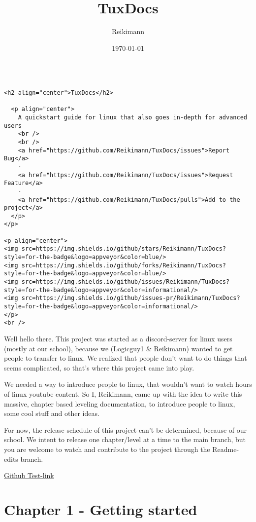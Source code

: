 \documentclass[a4]{article}
\author{Reikimann}
\date{\today}
\title{TuxDocs}
\begin{document}
\maketitle
\tableofcontents

\begin{verbatim}

<h2 align="center">TuxDocs</h2>

  <p align="center">
    A quickstart guide for linux that also goes in-depth for advanced users  
    <br />
    <br />
    <a href="https://github.com/Reikimann/TuxDocs/issues">Report Bug</a>
    ·
    <a href="https://github.com/Reikimann/TuxDocs/issues">Request Feature</a>
    ·
    <a href="https://github.com/Reikimann/TuxDocs/pulls">Add to the project</a>
  </p>
</p>

<p align="center">
<img src=https://img.shields.io/github/stars/Reikimann/TuxDocs?style=for-the-badge&logo=appveyor&color=blue/>
<img src=https://img.shields.io/github/forks/Reikimann/TuxDocs?style=for-the-badge&logo=appveyor&color=blue/>
<img src=https://img.shields.io/github/issues/Reikimann/TuxDocs?style=for-the-badge&logo=appveyor&color=informational/>
<img src=https://img.shields.io/github/issues-pr/Reikimann/TuxDocs?style=for-the-badge&logo=appveyor&color=informational/>
</p>
<br />

\end{verbatim}

Well hello there. This project was started as a discord-server for linux users (mostly at our school), because we (Logicguy1 \& Reikimann) wanted to get people to transfer to linux. We realized that people don't want to do things that seems complicated, so that's where this project came into play.

We needed a way to introduce people to linux, that wouldn't want to watch hours of linux youtube content. So I, Reikimann, came up with the idea to write this massive, chapter based leveling documentation, to introduce people to linux, some cool stuff and other ideas.

For now, the release schedule of this project can't be determined, because of our school. We intent to release one chapter/level at a time to the main branch, but you are welcome to watch and contribute to the project through the Readme-edits branch.

\href{https://github.com/Reikimann/TuxDocs}{Github Test-link}

\section*{Chapter 1 - Getting started}
\label{sec:org477810f}
\end{document}

